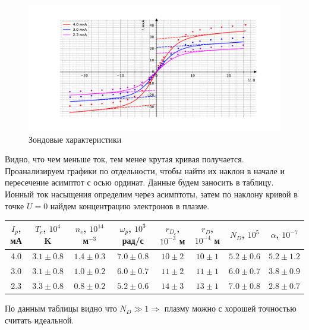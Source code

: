\documentclass[a4paper, 10pt]{article}
\begin{document}
        \begin{figure}[h!]
        	\centering
        	\includegraphics[width = \textwidth]{zond.pdf}
          \caption{Зондовые характеристики}
        \end{figure}

        Видно, что чем меньше ток, тем менее крутая кривая получается. Проанализируем графики по отдельности, чтобы найти их наклон в начале и пересечение асимптот с осью ординат. Данные будем заносить в таблицу. Ионный ток насыщения определим через асимптоты, затем по наклону кривой в точке $U = 0$ найдем концентрацию электронов в плазме.

      \begin{table}[h!]
      \begin{tabular}{|c|c|c|c|c|c|c|c|}
      \hline
      $I_p$, мА & $T_e$, $10^4$ K & $n_e$, $10^{14}$ м$^{-3}$ & $\omega_p$, $10^3$ рад/с & $r_{D_e}$, $10^{-3}$ м & $r_D$, $10^{-4}$ м & $N_D$, $10^5$ & $\alpha$, $10^{-7}$ \\ \hline
      4.0 & $ 3.1 \pm  0.8$ & $1.4 \pm 0.3$ & $7.0 \pm 0.8$ & $10 \pm 2$ & $10 \pm 1$ & $5.2 \pm 0.6$ & $5.2 \pm 1.2$ \\ \hline
      3.0 & $ 3.1 \pm  0.8$ & $1.0 \pm 0.2$ & $6.0 \pm 0.7$ & $11 \pm 2$ & $11 \pm 1$ & $6.0 \pm 0.7$ & $3.8 \pm 0.9$ \\ \hline
      2.3 & $ 3.3 \pm  0.8$ & $0.8 \pm 0.2$ & $5.2 \pm 0.6$ & $14 \pm 3$ & $13 \pm 1$ & $7.0 \pm 0.8$ & $2.8 \pm 0.7$ \\ \hline
      \end{tabular}

      \end{table}


      По данным таблицы видно что $N_D \gg 1 \Rightarrow$ плазму можно с хорошей точностью считать идеальной.
\end{document}
